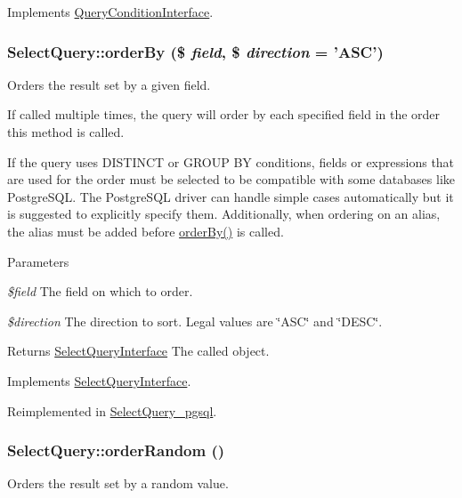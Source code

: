 Implements \hyperlink{interfaceQueryConditionInterface_a8aae11796846850edbf8caa3a9d4afcd}{QueryConditionInterface}.\hypertarget{classSelectQuery_a32ede93f2abfd7f8bc388d0c00512fae}{
\subsubsection[{orderBy}]{\setlength{\rightskip}{0pt plus 5cm}SelectQuery::orderBy (\$ {\em field}, \/  \$ {\em direction} = {\ttfamily 'ASC'})}}
\label{classSelectQuery_a32ede93f2abfd7f8bc388d0c00512fae}
Orders the result set by a given field.

If called multiple times, the query will order by each specified field in the order this method is called.

If the query uses DISTINCT or GROUP BY conditions, fields or expressions that are used for the order must be selected to be compatible with some databases like PostgreSQL. The PostgreSQL driver can handle simple cases automatically but it is suggested to explicitly specify them. Additionally, when ordering on an alias, the alias must be added before \hyperlink{classSelectQuery_a32ede93f2abfd7f8bc388d0c00512fae}{orderBy()} is called.


\begin{DoxyParams}{Parameters}
\item[{\em \$field}]The field on which to order. \item[{\em \$direction}]The direction to sort. Legal values are \char`\"{}ASC\char`\"{} and \char`\"{}DESC\char`\"{}. \end{DoxyParams}
\begin{DoxyReturn}{Returns}
\hyperlink{interfaceSelectQueryInterface}{SelectQueryInterface} The called object. 
\end{DoxyReturn}


Implements \hyperlink{interfaceSelectQueryInterface_a80eca1c7bc37fca0468b6526a3f303e7}{SelectQueryInterface}.

Reimplemented in \hyperlink{classSelectQuery__pgsql_adb1134a3498b05b32a33787418d68f8c}{SelectQuery\_\-pgsql}.\hypertarget{classSelectQuery_af284bacf9e56ccf177d17f4b4bc84b03}{
\subsubsection[{orderRandom}]{\setlength{\rightskip}{0pt plus 5cm}SelectQuery::orderRandom ()}}
\label{classSelectQuery_af284bacf9e56ccf177d17f4b4bc84b03}
Orders the result set by a random value.

